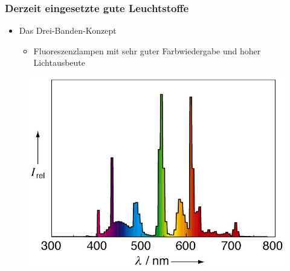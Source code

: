 \documentclass{beamer}
\begin{document}
\begin{frame}[t]\frametitle{\small Derzeit eingesetzte gute Leuchtstoffe }
  \begin{itemize}
    \item Das Drei-Banden-Konzept
          \begin{itemize}
            \item \footnotesize Fluoreszenzlampen mit sehr guter Farbwiedergabe und hoher Lichtausbeute
          \end{itemize}
  \end{itemize}

\begin{figure}[!h]
\centering
      \includegraphics[scale=0.2]{pics/dd.jpg}
      \caption*{\footnotesize {} }
 \end{figure}


\end{frame}
\end{document}
